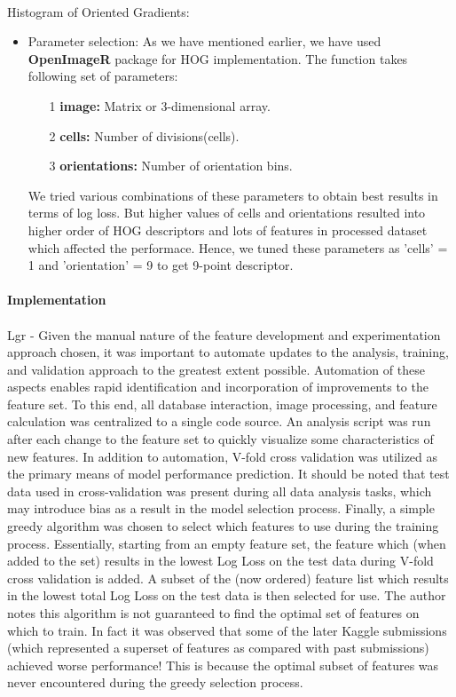 \documentclass[fleqn,10pt]{SelfArx} %
\begin{document}
\paragraph{}Histogram of Oriented Gradients:
\begin{itemize}
	\item{Parameter selection:} As we have mentioned earlier, we have used \textbf{OpenImageR} package for HOG implementation. The function takes following set of parameters:
	\begin{itemize}
		\item[1] \textbf{image:} Matrix or 3-dimensional array. 
		\item[2] \textbf{cells:} Number of divisions(cells).
		\item[3] \textbf{orientations:} Number of orientation bins.
	\end{itemize}
We tried various combinations of these parameters to obtain best results in terms of log loss. But higher values of cells and orientations resulted into higher order of HOG descriptors and lots of features in processed dataset which affected the performace. Hence, we tuned these parameters as 'cells' = 1 and 'orientation' = 9 to get 9-point descriptor.   
\end{itemize}
\paragraph{Implementation} 
\paragraph{}Lgr - Given the manual nature of the feature development and experimentation approach chosen, it was important to automate updates to the analysis, training, and validation approach to the greatest extent possible.  Automation of these aspects enables rapid identification and incorporation of improvements to the feature set.  To this end, all database interaction, image processing, and feature calculation was centralized to a single code source.  An analysis script was run after each change to the feature set to quickly visualize some characteristics of new features.  In addition to automation, V-fold cross validation was utilized as the primary means of model performance prediction.  It should be noted that test data used in cross-validation was present during all data analysis tasks, which may introduce bias as a result in the model selection process. \cite{cawley}  Finally, a simple greedy algorithm was chosen to select which features to use during the training process.  Essentially, starting from an empty feature set, the feature which (when added to the set) results in the lowest Log Loss on the test data during V-fold cross validation is added.  A subset of the (now ordered) feature list which results in the lowest total Log Loss on the test data is then selected for use.  The author notes this algorithm is not guaranteed to find the optimal set of features on which to train.  In fact it was observed that some of the later Kaggle submissions (which represented a superset of features as compared with past submissions) achieved worse performance!  This is because the optimal subset of features was never encountered during the greedy selection process.
\end{document}
